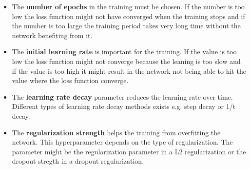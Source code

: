 \begin{itemize}
	\item The \textbf{number of epochs} in the training must be chosen. If the number is too low the loss function might not have converged when the training stops and if the number is too large the training period takes very long time without the network benefiting from it.
	\item The \textbf{initial learning rate} is important for the training. If the value is too low the loss function might not converge because the leaning is too slow and if the value is too high it might result in the network not being able to hit the value where the loss function converge.
	\item The \textbf{learning rate decay} parameter reduces the learning rate over time. Different types of learning rate decay methods exists e.g. step decay or 1/t decay.
	\item The \textbf{regularization strength} helps the training from overfitting
	the network. This hyperparameter depends on the type of regularization. The
	parameter might be the regularization parameter in a L2 regularization or the
	dropout stregth in a dropout regularization.
\end{itemize} 


